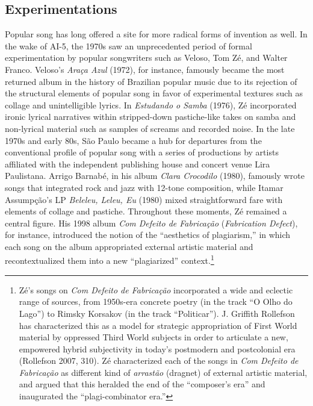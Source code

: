 \documentclass[twoside]{article}
\begin{document}
\hypertarget{experimentations}{%
\subsection*{Experimentations}\label{experimentations}}

Popular song has long offered a site for more radical forms of invention
as well. In the wake of AI-5, the 1970s saw an unprecedented period of
formal experimentation by popular songwriters such as Veloso, Tom Zé,
and Walter Franco. Veloso's \emph{Araça Azul} (1972), for instance,
famously became the most returned album in the history of Brazilian
popular music due to its rejection of the structural elements of popular
song in favor of experimental textures such as collage and
unintelligible lyrics. In \emph{Estudando o Samba} (1976), Zé
incorporated ironic lyrical narratives within stripped-down
pastiche-like takes on samba and non-lyrical material such as samples of
screams and recorded noise. In the late 1970s and early 80s, São Paulo
became a hub for departures from the conventional profile of popular
song with a series of productions by artists affiliated with the
independent publishing house and concert venue Lira Paulistana. Arrigo
Barnabé, in his album \emph{Clara Crocodilo} (1980), famously wrote
songs that integrated rock and jazz with 12-tone composition, while
Itamar Assumpção's LP \emph{Beleleu, Leleu, Eu} (1980) mixed
straightforward fare with elements of collage and pastiche. Throughout
these moments, Zé remained a central figure. His 1998 album \emph{Com
Defeito de Fabricação} (\emph{Fabrication Defect}), for instance,
introduced the notion of the ``aesthetics of plagiarism,'' in which each
song on the album appropriated external artistic material and
recontextualized them into a new ``plagiarized'' context.\footnote{Zé's
  songs on \emph{Com Defeito de Fabricação} incorporated a wide and
  eclectic range of sources, from 1950s-era concrete poetry (in the
  track ``O Olho do Lago'') to Rimsky Korsakov (in the track
  ``Politicar''). J. Griffith Rollefson has characterized this as a
  model for strategic appropriation of First World material by oppressed
  Third World subjects in order to articulate a new, empowered hybrid
  subjectivity in today's postmodern and postcolonial era (Rollefson
  2007, 310). Zé characterized each of the songs in \emph{Com Defeito de
  Fabricação} as different kind of \emph{arrastão} (dragnet) of external
  artistic material, and argued that this heralded the end of the
  ``composer's era'' and inaugurated the ``plagi-combinator era.''}
\end{document}
